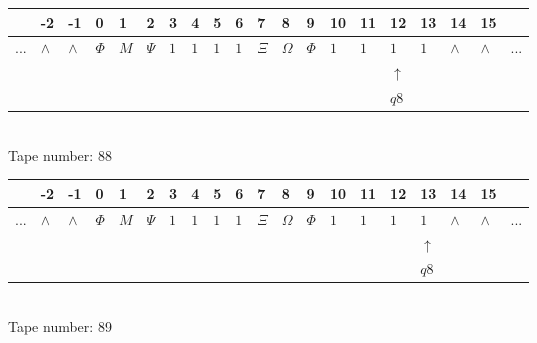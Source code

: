 \documentclass[11pt]{article}
\begin{document}
\begin{table}[H]
\centering
\begin{tabular}{llllllllllllllllllll}
 & -2 & -1 & 0 & 1 & 2 & 3 & 4 & 5 & 6 & 7 & 8 & 9 & 10 & 11 & 12 & 13 & 14 & 15 & \\
\hline
$...$ & \multicolumn{1}{|l|}{$\wedge$} & \multicolumn{1}{|l|}{$\wedge$} & \multicolumn{1}{|l|}{$\Phi$} & \multicolumn{1}{|l|}{$M$} & \multicolumn{1}{|l|}{$\Psi$} & \multicolumn{1}{|l|}{$1$} & \multicolumn{1}{|l|}{$1$} & \multicolumn{1}{|l|}{$1$} & \multicolumn{1}{|l|}{$1$} & \multicolumn{1}{|l|}{$\Xi$} & \multicolumn{1}{|l|}{$\Omega$} & \multicolumn{1}{|l|}{$\Phi$} & \multicolumn{1}{|l|}{$1$} & \multicolumn{1}{|l|}{$1$} & \multicolumn{1}{|l|}{$1$} & \multicolumn{1}{|l|}{$1$} & \multicolumn{1}{|l|}{$\wedge$} & \multicolumn{1}{|l|}{$\wedge$} & $...$\\
\hline
&  &  &  &  &  &  &  &  &  &  &  &  &  &  & $\uparrow$ &  &  &  &  \\
&  &  &  &  &  &  &  &  &  &  &  &  &  &  & $ q8 $ &  &  &  &  \\
\end{tabular}
\\
Tape number: 88
\noindent\makebox[\linewidth]{\hdashrule{\textwidth}{1pt}{1pt}}\end{table}

\begin{table}[H]
\centering
\begin{tabular}{llllllllllllllllllll}
 & -2 & -1 & 0 & 1 & 2 & 3 & 4 & 5 & 6 & 7 & 8 & 9 & 10 & 11 & 12 & 13 & 14 & 15 & \\
\hline
$...$ & \multicolumn{1}{|l|}{$\wedge$} & \multicolumn{1}{|l|}{$\wedge$} & \multicolumn{1}{|l|}{$\Phi$} & \multicolumn{1}{|l|}{$M$} & \multicolumn{1}{|l|}{$\Psi$} & \multicolumn{1}{|l|}{$1$} & \multicolumn{1}{|l|}{$1$} & \multicolumn{1}{|l|}{$1$} & \multicolumn{1}{|l|}{$1$} & \multicolumn{1}{|l|}{$\Xi$} & \multicolumn{1}{|l|}{$\Omega$} & \multicolumn{1}{|l|}{$\Phi$} & \multicolumn{1}{|l|}{$1$} & \multicolumn{1}{|l|}{$1$} & \multicolumn{1}{|l|}{$1$} & \multicolumn{1}{|l|}{$1$} & \multicolumn{1}{|l|}{$\wedge$} & \multicolumn{1}{|l|}{$\wedge$} & $...$\\
\hline
&  &  &  &  &  &  &  &  &  &  &  &  &  &  &  & $\uparrow$ &  &  &  \\
&  &  &  &  &  &  &  &  &  &  &  &  &  &  &  & $ q8 $ &  &  &  \\
\end{tabular}
\\
Tape number: 89
\noindent\makebox[\linewidth]{\hdashrule{\textwidth}{1pt}{1pt}}\end{table}
\clearpage
\end{document}
